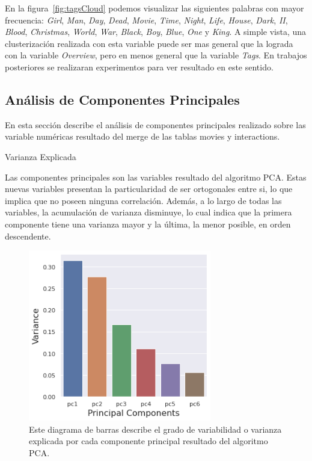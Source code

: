\documentclass[11pt,a4paper,twoside]{thesis}
\begin{document}
En la figura~\ref{fig:tagsCloud} podemos visualizar las siguientes palabras con
mayor frecuencia: \textit{Girl}, \textit{Man}, \textit{Day}, \textit{Dead},
\textit{Movie}, \textit{Time}, \textit{Night}, \textit{Life}, \textit{House},
\textit{Dark}, \textit{II}, \textit{Blood}, \textit{Christmas}, \textit{World},
\textit{War}, \textit{Black}, \textit{Boy}, \textit{Blue}, \textit{One} y
\textit{King}. A simple vista, una clusterización realizada con esta variable
puede ser mas general que la lograda con la variable \textit{Overview}, pero en
menos general que la variable \textit{Tags}. En trabajos posteriores se
realizaran experimentos para ver resultado en este sentido.

\clearpage

\subsection{Análisis de Componentes Principales}

En esta sección describe el análisis de componentes principales realizado sobre
las variable numéricas resultado del merge de las tablas movies y interactions.

\begin{description}
	\item[Varianza Explicada]
\end{description}

Las componentes principales son las variables resultado del algoritmo PCA.
Estas nuevas variables presentan la particularidad de ser ortogonales entre si,
lo que implica que no poseen ninguna correlación. Además, a lo largo de todas
las variables, la acumulación de varianza disminuye, lo cual indica que la
primera componente tiene una varianza mayor y la última, la menor posible, en
orden descendente.

\begin{figure}[h!]
	\centering
	\includegraphics[width=8cm]{./images/PCA-Variance.png}
	\caption{Este diagrama de barras describe el grado de variabilidad o varianza explicada por cada componente principal resultado del algoritmo PCA.}
	\label{fig:explainedVariancePlot}
\end{figure}
\end{document}

